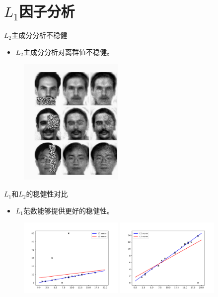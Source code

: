 \section{$L_1$因子分析}


\begin{frame}{$L_2$主成分分析不稳健}
    \begin{itemize}
        \item
        $L_2$主成分分析对离群值不稳健。
      \end{itemize}
    \begin{figure}[H]
        \includegraphics[width=5cm]{pics/face.png}
    \end{figure}
\end{frame}

\begin{frame}{
    $L_1$和$L_2$的稳健性对比}
    \begin{itemize}
        \item
        $L_1$范数能够提供更好的稳健性。
      \end{itemize}
    \begin{figure}[H]
        \includegraphics[width=5cm]{pics/l1-l2-diff.pdf}
        \includegraphics[width=5cm]{pics/l1-l2-diff2.pdf}
    \end{figure}
\end{frame}


